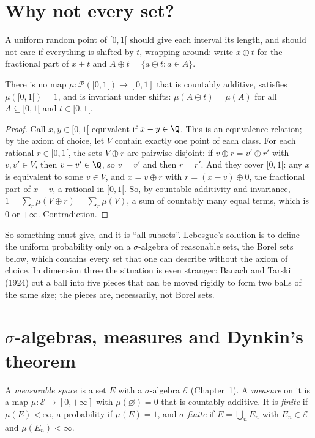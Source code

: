 \section{Why not every set?}

A uniform random point of $[0,1[$ should give each interval its length, and should not care if everything is
shifted by $t$, wrapping around: write $x\oplus t$ for the fractional part of $x+t$ and $A\oplus t=\{a\oplus t:a\in A\}$.

\begin{theorem}[Vitali, 1905]\label{thm:vitali}
There is no map $\mu:\mathcal P([0,1[)\to[0,1]$ that is countably additive, satisfies $\mu([0,1[)=1$, and is invariant under
shifts: $\mu(A\oplus t)=\mu(A)$ for all $A\subseteq[0,1[$ and $t\in[0,1[$.
\end{theorem}
\begin{proof}
Call $x,y\in[0,1[$ equivalent if $x-y\in\Q$. This is an equivalence relation; by the axiom of choice, let $V$ contain exactly
one point of each class. For each rational $r\in[0,1[$, the sets $V\oplus r$ are pairwise disjoint: if $v\oplus r=v'\oplus r'$ with
$v,v'\in V$, then $v-v'\in\Q$, so $v=v'$ and then $r=r'$. And they cover $[0,1[$: any $x$ is equivalent to some $v\in V$, and
$x=v\oplus r$ with $r=(x-v)\oplus0$, the fractional part of $x-v$, a rational in $[0,1[$. So, by countable additivity and invariance,
$1=\sum_r\mu(V\oplus r)=\sum_r\mu(V)$, a sum of countably many equal terms, which is $0$ or $+\infty$. Contradiction.
\end{proof}

So something must give, and it is ``all subsets''. Lebesgue's solution is to define the uniform probability only
on a $\sigma$-algebra of reasonable sets, the Borel sets below, which contains every set that one can describe
without the axiom of choice. In dimension three the situation is even stranger: Banach and Tarski (1924) cut a ball
into five pieces that can be moved rigidly to form two balls of the same size; the pieces are, necessarily,
not Borel sets.

\section{\texorpdfstring{$\sigma$}{Sigma}-algebras, measures and Dynkin's theorem}

\begin{definition}
A \emph{measurable space} is a set $E$ with a $\sigma$-algebra $\mathcal E$ (Chapter~1). A \emph{measure} on it is a map
$\mu:\mathcal E\to[0,+\infty]$ with $\mu(\varnothing)=0$ that is countably additive. It is \emph{finite} if $\mu(E)<\infty$, a probability if $\mu(E)=1$, and
\emph{$\sigma$-finite} if $E=\bigcup_nE_n$ with $E_n\in\mathcal E$ and $\mu(E_n)<\infty$.
\end{definition}

